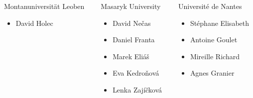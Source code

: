 \documentclass[noamsthm,8pt,t,xcolor={dvipsnames}]{beamer}
\begin{document}
\begin{frame}
{      \begin{columns}
         \begin{column}{0.3\textwidth}
            Montanuniversität Leoben
            \begin{itemize}
               \item David Holec
            \end{itemize}
         \end{column}
         \begin{column}{0.3\textwidth}
            Masaryk University
            \begin{itemize}
               \item David Nečas
               \item Daniel Franta
               \item Marek Eliáš
               \item Eva Kedroňová
               \item Lenka Zajíčková
            \end{itemize}
         \end{column}
         \begin{column}{0.3\textwidth}
            Université de Nantes
            \begin{itemize}
               \item Stéphane Elisabeth
               \item Antoine Goulet
               \item Mireille Richard
               \item Agnes Granier
            \end{itemize}
         \end{column}
      \end{columns} 
   }
   \vspace{0.5cm}

\end{frame}
\end{document}
